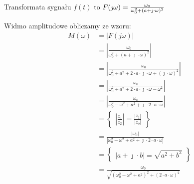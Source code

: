 \begin{task}
Transformata sygnału $f(t)$ to $F(\jmath \omega)=\frac{\omega_{0}}{\omega_{0}^{2} + (a + \jmath \cdot \omega)^{2}}\\$

Widmo amplitudowe obliczamy ze wzoru:
\begin{align*}
M(\omega)&=\left| F(j \omega) \right|\\
&=\left| \frac{\omega_{0}}{\omega_{0}^{2} + (a + \jmath \cdot \omega)^{2}} \right|\\
&=\left| \frac{\omega_{0}}{\omega_{0}^{2} + a^2 + 2\cdot a \cdot \jmath \cdot \omega + \left(\jmath \cdot \omega\right)^{2}}\right|\\
&=\left| \frac{\omega_{0}}{\omega_{0}^{2} + a^2 + 2\cdot a \cdot \jmath \cdot \omega - \omega^{2}}\right|\\
&=\left| \frac{\omega_{0}}{\omega_{0}^{2}- \omega^{2} + a^2 + \jmath \cdot 2\cdot a \cdot \omega }\right|\\
&=\begin{Bmatrix}
\left|\frac{z_1}{z_2}\right| = \frac{\left|z_1\right|}{\left|z_2\right|}
\end{Bmatrix}\\
&=\frac{\left|\omega_{0}\right|}{\left|\omega_{0}^{2}- \omega^{2} + a^2 + \jmath \cdot 2\cdot a \cdot \omega \right|}\\
&=\begin{Bmatrix}
\left|a+\jmath \cdot b\right| = \sqrt{a^2+b^2}
\end{Bmatrix}\\
&=\frac{\omega_{0}}{\sqrt{\left(\omega_{0}^{2}- \omega^{2} + a^2 \right)^2+ \left( 2\cdot a \cdot \omega \right)^2}}\\
\end{align*}

\begin{figure}[H]
  \centering
\end{figure}
\end{task}

